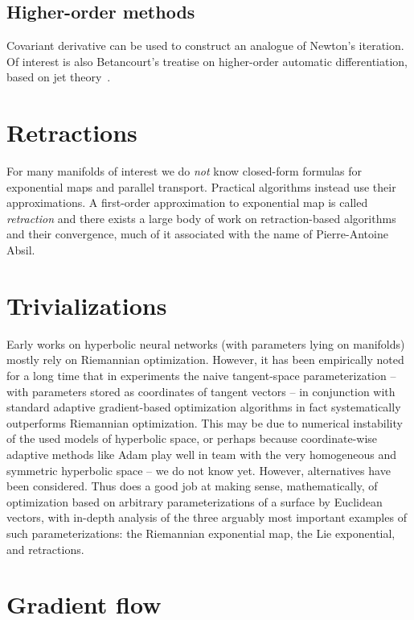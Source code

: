 \subsection*{Higher-order methods}

Covariant derivative can be used to construct an analogue of Newton's
iteration. Of interest is also Betancourt's treatise on higher-order automatic
differentiation, based on jet theory~\cite{betancourt2018geometric}.

\section*{Retractions}

For many manifolds of interest we do \emph{not} know closed-form formulas for
exponential maps and parallel transport. Practical algorithms instead use their
approximations. A first-order approximation to exponential map is called
\emph{retraction} and there exists a large body of work on retraction-based
algorithms and their convergence, much of it associated with the name of
Pierre-Antoine Absil.

\section*{Trivializations}

Early works on hyperbolic neural networks (with parameters lying on manifolds)
mostly rely on Riemannian optimization. However, it has been empirically noted
for a long time that in experiments the naive tangent-space parameterization --
with parameters stored as coordinates of tangent vectors -- in conjunction with
standard adaptive gradient-based optimization algorithms in fact systematically
outperforms Riemannian optimization. This may be due to numerical instability
of the used models of hyperbolic space, or perhaps because coordinate-wise
adaptive methods like Adam play well in team with the very homogeneous and
symmetric hyperbolic space -- we do not know yet. However, alternatives have
been considered. Thus \citet{trivializations} does a good job at making sense,
mathematically, of optimization based on arbitrary parameterizations of a
surface by Euclidean vectors, with in-depth analysis of the three arguably most
important examples of such parameterizations: the Riemannian exponential map,
the Lie exponential, and retractions.

\section*{Gradient flow}

